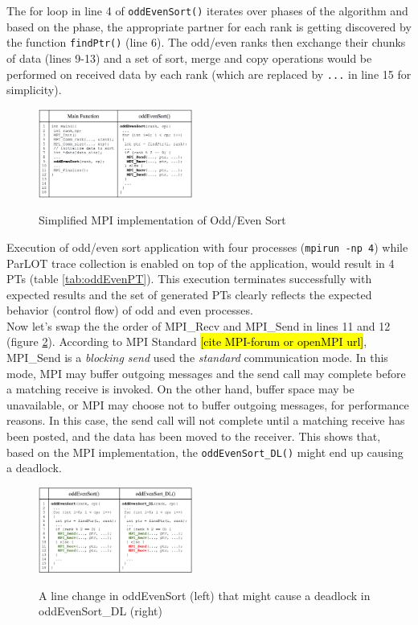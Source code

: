 The for loop in line 4 of \texttt{oddEvenSort()} iterates over phases of the algorithm and based on the phase, the appropriate partner for each rank is getting discovered by the function \texttt{findPtr()} (line 6). The odd/even ranks then exchange their chunks of data (lines 9-13) and a set of sort, merge and copy operations would be performed on received data by each rank (which are replaced by \texttt{...} in line 15 for simplicity).

\begin{figure}[]
\centering
\caption{Simplified MPI implementation of Odd/Even Sort}
\includegraphics[width=0.45\textwidth]{figs/oddEven.png}
\label{fig.oddEven}
\end{figure}


Execution of odd/even sort application with four processes (\texttt{mpirun -np 4}) while ParLOT trace collection is enabled on top of the application, would result in 4 PTs (table \ref{tab:oddEvenPT}). This execution terminates successfully with expected results and the set of generated PTs clearly reflects the expected behavior (control flow) of odd and even processes.
%
\\
Now let's swap the the order of MPI\_Recv and MPI\_Send in lines 11 and 12 (figure \ref{fig.oddEvenDL}). According to MPI Standard  \hl{[cite MPI-forum or openMPI url]}, MPI\_Send is a \textit{blocking send} used the \textit{standard} communication mode. In this mode,  MPI may buffer outgoing messages and the send call may complete before a matching receive is invoked. On the other hand, buffer space may be unavailable, or MPI may choose not to buffer outgoing messages, for performance reasons. In this case, the send call will not complete until a matching receive has been posted, and the data has been moved to the receiver. This shows that, based on the MPI implementation, the \texttt{oddEvenSort\_DL()} might end up causing a deadlock.



\begin{figure}[]
\centering
\caption{A line change in oddEvenSort (left) that might cause a deadlock in oddEvenSort\_DL (right)}
\includegraphics[width=0.45\textwidth]{figs/oddEvenDL.png}
\label{fig.oddEvenDL}
\end{figure}


